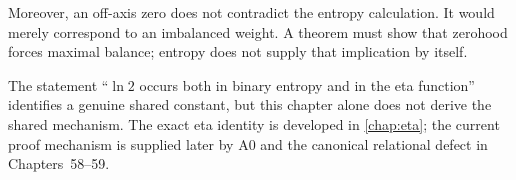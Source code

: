 Moreover, an off-axis zero does not contradict the entropy calculation. It would merely correspond to an imbalanced weight. A theorem must show that zerohood forces maximal balance; entropy does not supply that implication by itself.

\begin{warning}
The statement ``$\ln2$ occurs both in binary entropy and in the eta function'' identifies a genuine shared constant, but this chapter alone does not derive the shared mechanism. The exact eta identity is developed in \cref{chap:eta}; the current proof mechanism is supplied later by A0 and the canonical relational defect in Chapters~58--59.
\end{warning}

